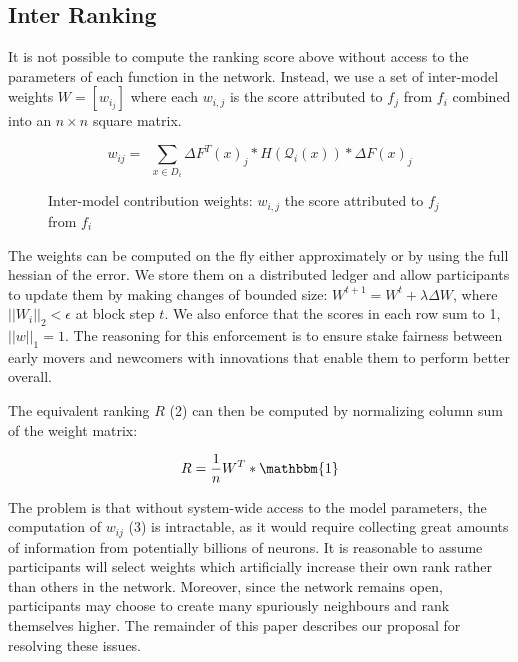 \documentclass{article}
\begin{document}
\subsection{Inter Ranking}
\label{sec:inter-ranking}
It is not possible to compute the ranking score above without access to the parameters of each function in the network. Instead, we use a set of inter-model weights $W = [w_{i_j}]$ where each $w_{i,j}$ is the score attributed to $f_j$ from $f_i$ combined into an $n \times n$ square matrix.
\bigskip

\begin{equation}
w_{ij} = \ \ \sum_{x \in D_i} \Delta F^T(x)_j * H(\mathcal{Q}_i(x)) * \Delta F(x)_j
\end{equation}

\begin{figure}[H]
	\centering
	\hspace*{-2cm}
	
	\caption{Inter-model contribution weights: $w_{i,j}$ the score attributed to $f_j$ from $f_i$}
\end{figure}{}


The weights can be computed on the fly either approximately \cite{yu2017nisp} or by using the full hessian of the error. We store them on a distributed ledger and allow participants to update them by making changes of bounded size: $W^{t+1}= W^t + \lambda \Delta W$, where $||W_i||_2 < \epsilon$ at block step $t$. We also enforce that the scores in each row sum to 1, $||w||_1 = 1$. {\color{blue} The reasoning for this enforcement is to ensure stake fairness between early movers and newcomers with innovations that enable them to perform better overall.}

The equivalent ranking $R$ (2) can then be computed by normalizing column sum of the weight matrix:
\bigskip

\begin{equation}
R = \frac{1}{n} W^T * \mathbbm{1}
\end{equation}

The problem is that without system-wide access to the model parameters, the computation of $w_{ij}$ (3) is intractable, {\color{blue} as it would require collecting great amounts of information from potentially billions of neurons}. It is reasonable to assume participants will select weights which artificially increase their own rank rather than others in the network. Moreover, since the network remains open, participants may choose to create many spuriously neighbours and rank themselves higher. The remainder of this paper describes our proposal for resolving these issues.
\bigskip
\end{document}
